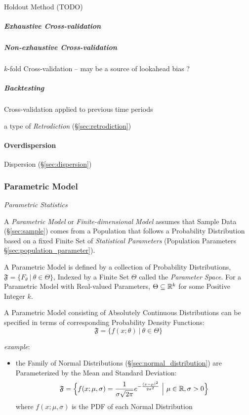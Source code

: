Holdout Method (TODO)



\subparagraph{Exhaustive Cross-validation}
\label{sec:exhaustive_cross_validation}\hfill

\subparagraph{Non-exhaustive Cross-validation}
\label{sec:nonexhaustive_cross_validation}\hfill

$k$-fold Cross-validation -- may be a source of lookahead bias ?



\subparagraph{Backtesting}\label{sec:backtesting}\hfill

Cross-validation applied to previous time periods

a type of \emph{Retrodiction} (\S\ref{sec:retrodiction})



\paragraph{Overdispersion}\label{sec:overdispersion}\hfill


Dispersion (\S\ref{sec:dispersion})



\subsubsection{Parametric Model}\label{sec:parametric_model}

\emph{Parametric Statistics}

A \emph{Parametric Model} or \emph{Finite-dimensional Model} assumes that Sample
Data (\S\ref{sec:sample}) comes from a Population that follows a Probability
Distribution based on a fixed Finite Set of \emph{Statistical Parameters}
(Population Parameters \S\ref{sec:population_parameter}).

A Parametric Model is defined by a collection of Probability Distributions,
$\mathfrak{F} = \{ F_\theta \ |\ \theta \in \Theta \}$, Indexed by a Finite Set
$\Theta$ called the \emph{Parameter Space}. For a Parametric Model with
Real-valued Parameters, $\Theta \subseteq \mathbb{R}^k$ for some Positive Integer
$k$.

A Parametric Model consisting of Absolutely Continuous Distributions
can be specified in terms of corresponding Probability Density Functions:
\[
  \mathfrak{F} = \{ f(x; \theta) \ |\ \theta \in \Theta \}
\]

\emph{example}:
\begin{itemize}
  \item the Family of Normal Distributions (\S\ref{sec:normal_distribution}) are
    Parameterized by the Mean and Standard Deviation:
    \[
      \mathfrak{F} = \Big\{
        f(x; \mu, \sigma) =
          \frac{1}{\sigma\sqrt{2\pi}}e^{-\frac{(x-\mu)^2}{2\sigma^2}}
        \ \Big|\ \mu \in \mathbb{R}, \sigma > 0
      \Big\}
    \]
    where $f(x; \mu, \sigma)$ is the PDF of each Normal Distribution
\end{itemize}

